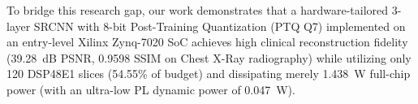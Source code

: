 \documentclass[conference]{IEEEtran}
\begin{document}
To bridge this research gap, our work demonstrates that a hardware-tailored 3-layer SRCNN with 8-bit Post-Training Quantization (PTQ Q7) implemented on an entry-level Xilinx Zynq-7020 SoC achieves high clinical reconstruction fidelity (39.28~dB PSNR, 0.9598 SSIM on Chest X-Ray radiography) while utilizing only 120 DSP48E1 slices (54.55\% of budget) and dissipating merely 1.438~W full-chip power (with an ultra-low PL dynamic power of 0.047~W).



\end{document}
